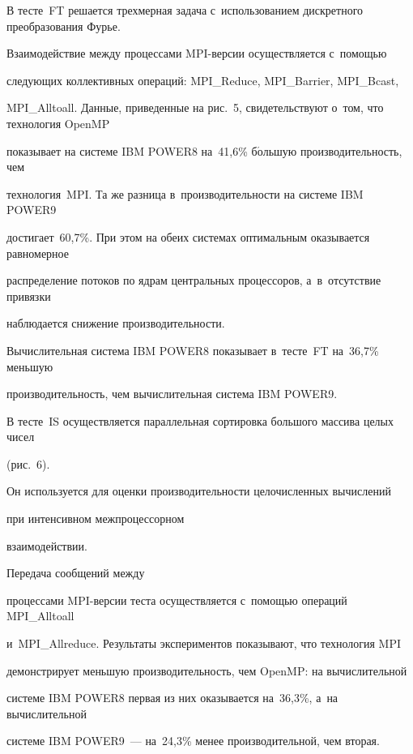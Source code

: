 В тесте~FT решается трехмерная задача с~использованием дискретного преобразования Фурье. 


Взаимодействие между процессами MPI-вер\-сии осуществляется с~по\-мощью 


следующих коллективных операций: MPI\_Reduce, MPI\_Barrier, MPI\_Bcast, 


MPI\_Alltoall. Данные, приведенные на рис.~5, свидетельствуют о~том, что технология \mbox{OpenMP} 


показывает на системе IBM \mbox{POWER8} на~41,6\% б$\acute{\mbox{о}}$льшую производительность, чем 


технология~MPI. Та же разница в~производительности на системе IBM POWER9 


достигает~60,7\%. При этом на обеих сис\-те\-мах оптимальным оказывается равномерное 


распределение потоков по ядрам цент\-раль\-ных процессоров, а~в~отсутствие привязки 


наблюдается снижение про\-из\-во\-ди\-тель\-ности.








Вычислительная система IBM \mbox{POWER8} показывает в~тес\-те~FT на~36,7\% меньшую 


про\-из\-во\-ди\-тель\-ность, чем вычислительная сис\-те\-ма IBM \mbox{POWER9}.





В тесте~IS осуществляется параллельная сортировка большого массива целых чисел 


(рис.~6). 


Он используется для оценки производительности целочисленных вычислений 


при интенсивном межпроцессорном 


взаимодействии. 


Передача сообщений между 


процессами MPI-вер\-сии теста осуществляется с~по\-мощью операций MPI\_Alltoall 


и~MPI\_Allreduce. Результаты экспериментов показывают, что технология MPI 


демонстрирует меньшую производительность, чем \mbox{OpenMP}: на вычислительной 


системе IBM \mbox{POWER8} первая из них оказывается на~36,3\%, а~на вычислительной 


системе IBM \mbox{POWER9}~--- на~24,3\% менее производительной, чем вторая.


